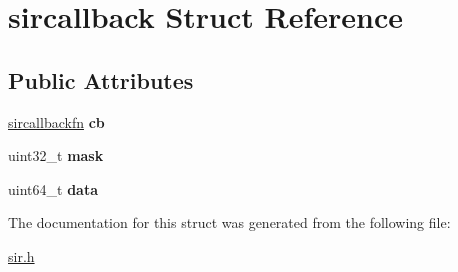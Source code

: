 \hypertarget{structsircallback}{}\section{sircallback Struct Reference}
\label{structsircallback}
\subsection*{Public Attributes}
\begin{DoxyCompactItemize}
\item 
\hyperlink{sir_8h_ace3ea4091f07fc8e8cde5b1c14b3fd29}{sircallbackfn} {\bfseries cb}\hypertarget{structsircallback_a3ef42608fdde48df814d21a10b8db417}{}\label{structsircallback_a3ef42608fdde48df814d21a10b8db417}

\item 
uint32\+\_\+t {\bfseries mask}\hypertarget{structsircallback_a84619409d7b0277005521e4f60a5789f}{}\label{structsircallback_a84619409d7b0277005521e4f60a5789f}

\item 
uint64\+\_\+t {\bfseries data}\hypertarget{structsircallback_a58c143d45ba4a6a38d3e82bdc0fb16ce}{}\label{structsircallback_a58c143d45ba4a6a38d3e82bdc0fb16ce}

\end{DoxyCompactItemize}


The documentation for this struct was generated from the following file\+:\begin{DoxyCompactItemize}
\item 
\hyperlink{sir_8h}{sir.\+h}\end{DoxyCompactItemize}
